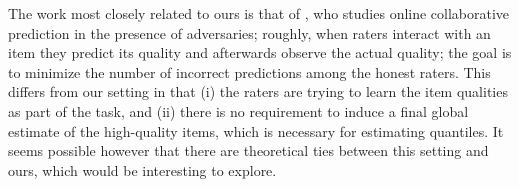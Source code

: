 
The work most closely related to ours is that of \citet{christiano2014provably,
christiano2016robust}, who studies online collaborative prediction in 
the presence of adversaries; roughly, when raters interact with an item 
they predict its quality and afterwards observe the actual quality; the 
goal is to minimize the number of incorrect 
predictions among the honest raters. This differs from our setting in that 
(i) the raters are trying to learn the item qualities as part of the task, 
and (ii) there is no requirement to induce a final global estimate of the 
high-quality items, which is necessary for estimating quantiles.
It seems possible however that there are theoretical ties between this 
setting and ours, which would be interesting to explore.
